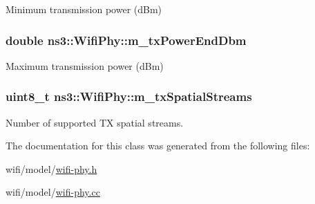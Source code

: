 Minimum transmission power (d\+Bm) 

\subsubsection[{\texorpdfstring{m\+\_\+tx\+Power\+End\+Dbm}{m_txPowerEndDbm}}]{\setlength{\rightskip}{0pt plus 5cm}double ns3\+::\+Wifi\+Phy\+::m\+\_\+tx\+Power\+End\+Dbm\hspace{0.3cm}{\ttfamily [private]}}\hypertarget{classns3_1_1WifiPhy_ac2e14dc0931c5808c5338a57dfb4e47b}{}\label{classns3_1_1WifiPhy_ac2e14dc0931c5808c5338a57dfb4e47b}


Maximum transmission power (d\+Bm) 

\subsubsection[{\texorpdfstring{m\+\_\+tx\+Spatial\+Streams}{m_txSpatialStreams}}]{\setlength{\rightskip}{0pt plus 5cm}uint8\+\_\+t ns3\+::\+Wifi\+Phy\+::m\+\_\+tx\+Spatial\+Streams\hspace{0.3cm}{\ttfamily [private]}}\hypertarget{classns3_1_1WifiPhy_a0eb352acc5252d87026c154c673060f5}{}\label{classns3_1_1WifiPhy_a0eb352acc5252d87026c154c673060f5}


Number of supported TX spatial streams. 



The documentation for this class was generated from the following files\+:\begin{DoxyCompactItemize}
\item 
wifi/model/\hyperlink{wifi-phy_8h}{wifi-\/phy.\+h}\item 
wifi/model/\hyperlink{wifi-phy_8cc}{wifi-\/phy.\+cc}\end{DoxyCompactItemize}

